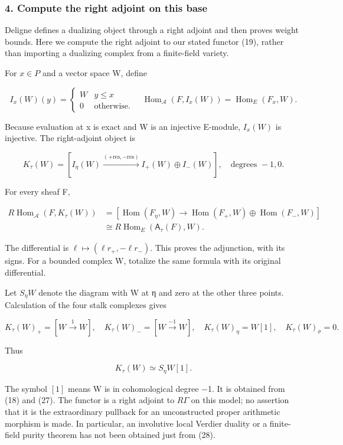 \subsubsection{4. Compute the right adjoint on this base}\label{endpoint-tau_base--compute-the-right-adjoint-on-this-base}

Deligne defines a dualizing object through a right adjoint and then proves weight bounds. Here we compute the right adjoint to our stated functor (19), rather than importing a dualizing complex from a finite-field variety.

For \(x\in P\) and a vector space W, define

\[
I_x(W)(y)=\begin{cases}W&y\le x\\0&\text{otherwise}.\end{cases}
\quad
\operatorname{Hom}_{\mathcal A}(F,I_x(W))
=\operatorname{Hom}_E(F_x,W).
\tag{26}
\]

Because evaluation at x is exact and W is an injective E-module, \(I_x(W)\) is injective. The right-adjoint object is

\[
\boxed{
K_\tau(W)=
[I_\eta(W)\xrightarrow{(+\mathrm{res},-\mathrm{res})}
 I_+(W)\oplus I_-(W)],
\quad\text{degrees }-1,0.
}
\tag{27}
\]

For every sheaf F,

\[
\begin{aligned}
R\operatorname{Hom}_{\mathcal A}(F,K_\tau(W))
&=[\operatorname{Hom}(F_\eta,W)
 \longrightarrow\operatorname{Hom}(F_+,W)\oplus\operatorname{Hom}(F_-,W)]\\
&\cong R\operatorname{Hom}_E(\mathsf A_\tau(F),W).
\end{aligned}
\tag{28}
\]

The differential is \(\ell\mapsto(\ell r_+,-\ell r_-)\). This proves the adjunction, with its signs. For a bounded complex W, totalize the same formula with its original differential.

Let \(S_\eta W\) denote the diagram with W at η and zero at the other three points. Calculation of the four stalk complexes gives

\[
K_\tau(W)_+=[W\xrightarrow{1}W],\quad
K_\tau(W)_-=[W\xrightarrow{-1}W],\quad
K_\tau(W)_\eta=W[1],\quad K_\tau(W)_\sigma=0.
\tag{29}
\]

Thus

\[
\boxed{K_\tau(W)\simeq S_\eta W[1].}
\tag{30}
\]

The symbol \([1]\) means W is in cohomological degree −1. It is obtained from (18) and (27). The functor is a right adjoint to \(R\Gamma\) on this model; no assertion that it is the extraordinary pullback for an unconstructed proper arithmetic morphism is made. In particular, an involutive local Verdier duality or a finite-field purity theorem has not been obtained just from (28).

